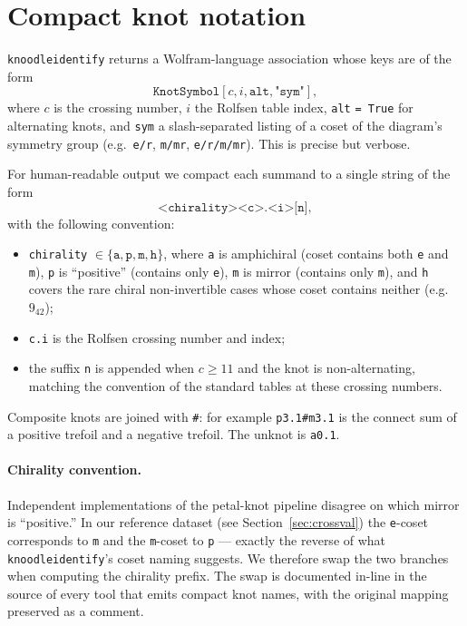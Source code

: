 \documentclass[11pt,oneside]{report}
\theoremstyle{definition}
\begin{document}
\section{Compact knot notation}\label{sec:compact}

\texttt{knoodleidentify} returns a Wolfram-language association whose keys
are of the form
\[
\texttt{KnotSymbol}[c, i, \texttt{alt}, \texttt{"sym"}],
\]
where $c$ is the crossing number, $i$ the Rolfsen table index,
\texttt{alt} \texttt{= True} for alternating knots, and \texttt{sym} a
slash-separated listing of a coset of the diagram's symmetry group (e.g.\
\texttt{e/r}, \texttt{m/mr}, \texttt{e/r/m/mr}). This is precise but
verbose.

For human-readable output we compact each summand to a single string of the
form
\[
\texttt{<chirality><c>.<i>[n]},
\]
with the following convention:
\begin{itemize}[leftmargin=2em]
\item \texttt{chirality} $\in \{\texttt{a}, \texttt{p}, \texttt{m}, \texttt{h}\}$,
where \texttt{a} is amphichiral (coset contains both \texttt{e} and
\texttt{m}), \texttt{p} is ``positive'' (contains only \texttt{e}),
\texttt{m} is mirror (contains only \texttt{m}), and \texttt{h} covers
the rare chiral non-invertible cases whose coset contains neither
(e.g.\ $9_{42}$);
\item \texttt{c.i} is the Rolfsen crossing number and index;
\item the suffix \texttt{n} is appended when $c \geq 11$ and the knot is
non-alternating, matching the convention of the standard tables at
these crossing numbers.
\end{itemize}
Composite knots are joined with \texttt{\#}: for example
\texttt{p3.1\#m3.1} is the connect sum of a positive trefoil and a
negative trefoil. The unknot is \texttt{a0.1}.

\paragraph{Chirality convention.}
Independent implementations of the petal-knot pipeline disagree on which
mirror is ``positive.'' In our reference dataset (see
Section~\ref{sec:crossval}) the \texttt{e}-coset corresponds to
\texttt{m} and the \texttt{m}-coset to \texttt{p} --- exactly the
reverse of what \texttt{knoodleidentify}'s coset naming suggests. We
therefore swap the two branches when computing the chirality prefix.
The swap is documented in-line in the source of every tool that emits
compact knot names, with the original mapping preserved as a comment.
\end{document}
